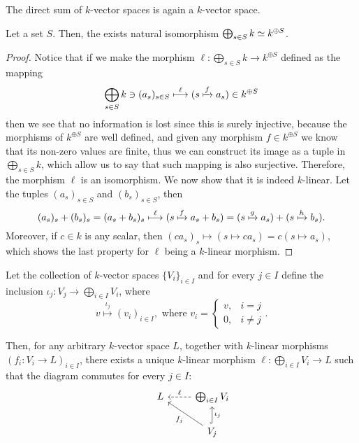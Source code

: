 \begin{proposition}
   The direct sum of \(k\)-vector spaces is again a \(k\)-vector space.
\end{proposition}

\begin{proposition}
   Let a set \(S\). Then, the exists natural isomorphism \(\bigoplus_{s \in S} k
   \simeq k^{\oplus S}\).
\end{proposition}

\begin{proof}
   Notice that if we make the morphism \(\ell : \bigoplus_{s \in S} k \to
   k^{\oplus S}\) defined as the mapping
   \[
      \bigoplus_{s \in S} k \ni (a_s)_{s \in S} \overset{\ell}\longmapsto (s
      \xmapsto{f} a_s) \in k^{\oplus S}
   \]
   then we see that no information is lost since this is surely injective,
   because the morphisms of \(k^{\oplus S}\) are well defined, and given any
   morphism \(f \in k^{\oplus S}\) we know that its non-zero values are finite,
   thus we can construct its image as a tuple in \(\bigoplus_{s \in S} k\),
   which allow us to say that such mapping is also surjective. Therefore, the
   morphism \(\ell\) is an isomorphism. We now show that it is indeed
   \(k\)-linear. Let the tuples \((a_s)_{s \in S}\) and \((b_s)_{s \in S}\),
   then
   \[
      (a_s)_s + (b_s)_s = (a_s + b_s)_s \overset \ell \longmapsto (s \xmapsto f
      a_s + b_s) = (s \xmapsto g a_s) + (s \xmapsto h b_s).
   \]
   Moreover, if \(c \in k\) is any scalar, then \((c a_s)_s \longmapsto (s
   \mapsto c a_s) = c (s \mapsto a_s)\), which shows the last property for
   \(\ell\) being a \(k\)-linear morphism.
\end{proof}

\begin{proposition}
   Let the collection of \(k\)-vector spaces \(\{V_i\}_{i \in I}\) and for every
   \(j \in I\) define the inclusion \(\iota_j : V_j \to \bigoplus_{i \in I}
   V_i\), where
   \[
      v \overset{\iota_j}\longmapsto (v_i)_{i \in I}, \text{ where } v_i =
      \begin{cases}
         v, &i = j \\
         0, &i \neq j
      \end{cases}.
   \]

   Then, for any arbitrary \(k\)-vector space \(L\), together with \(k\)-linear
   morphisms \((f_i : V_i \to L)_{i \in I}\), there exists a unique \(k\)-linear
   morphism \(\ell : \bigoplus_{i \in I} V_i \to L\) such that the diagram
   commutes for every \(j \in I\):
   \[
      \begin{tikzcd}
         &L &\bigoplus_{i \in I} V_i \ar[l, dashed, swap, "\ell"]  \\
         & &V_j \ar[u, hook, swap, "\iota_j"] \ar[ul, "f_j"]
      \end{tikzcd}
   \]
\end{proposition}

